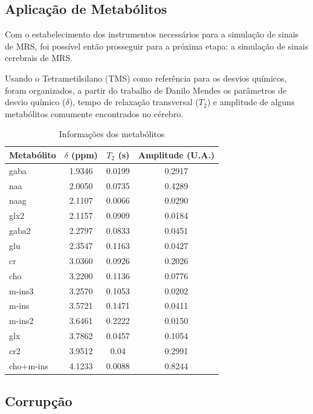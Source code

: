 \documentclass{article}
\begin{document}
\subsection{Aplicação de Metabólitos}

Com o estabelecimento dos instrumentos necessários para a simulação de sinais de MRS, foi possível então prosseguir para a próxima etapa:
a simulação de sinais cerebrais de MRS.

Usando o Tetrametilsilano (TMS) como referência para os desvios químicos, foram organizados, a partir do trabalho de Danilo Mendes \cite{Silva2020-io} 
os parâmetros de desvio químico ($\delta$), tempo de relaxação transversal ($T_2$) e amplitude de alguns metabólitos comumente encontrados no cérebro.

\begin{table}[H]
    \centering
    \begin{tabular}{|l|c|c|c|}
    \hline
    Metabólito & $\delta$ (ppm) & $T_2$ (s) & Amplitude (U.A.) \\
    \hline
    gaba & 1.9346 & 0.0199 & 0.2917 \\
    naa & 2.0050 & 0.0735 & 0.4289 \\
    naag & 2.1107 & 0.0066 & 0.0290 \\
    glx2 & 2.1157 & 0.0909 & 0.0184 \\
    gaba2 & 2.2797 & 0.0833 & 0.0451 \\
    glu & 2.3547 & 0.1163 & 0.0427 \\
    cr & 3.0360 & 0.0926 & 0.2026 \\
    cho & 3.2200 & 0.1136 & 0.0776 \\
    m-ins3 & 3.2570 & 0.1053 & 0.0202 \\
    m-ins & 3.5721 & 0.1471 & 0.0411 \\
    m-ins2 & 3.6461 & 0.2222 & 0.0150 \\
    glx & 3.7862 & 0.0457 & 0.1054 \\
    cr2 & 3.9512 & 0.04 & 0.2991 \\
    cho+m-ins & 4.1233 & 0.0088 & 0.8244 \\
    \hline
    \end{tabular}
    \caption{Informações dos metabólitos}
\end{table}

\subsection{Corrupção}
\end{document}
